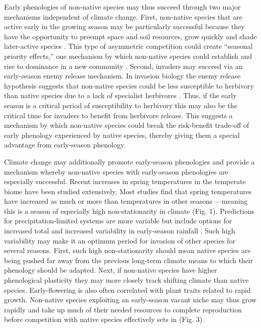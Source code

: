 \documentclass[11pt,a4paper,oneside]{article}
\begin{document}
Early phenologies of non-native species may thus succeed through two major mechanisms independent of climate change. First, non-native species that are active early in the growing season may be particularly successful because they have the opportunity to preempt space and soil resources, grow quickly and shade later-active species \citep{Weiner1990,Wilsey:2011cr,wolkovich:2010fee}. This type of asymmetric competition could create ``seasonal priority effects,'' one mechanism by which non-native species could establish and rise to dominance in a new community \citep{dickson2012,Wainwright:2012tw}. Second, invaders may succeed via an early-season enemy release mechanism. In invasion biology the enemy release hypothesis suggests that non-native species could be less susceptible to herbivory than native species due to a lack of specialist herbivores \citep{Keane:2002uz,Liu:2006kj}. Thus, if the early season is a critical period of susceptibility to herbivory \citep{Feeny1970,Barbehenn2013} this may also be the critical time for invaders to benefit from herbivore release. This suggests a mechanism by which non-native species could break the risk-benefit trade-off of early phenology experienced by native species, thereby giving them a special advantage from early-season phenology.

Climate change may additionally promote early-season phenologies and provide a mechanism whereby non-native species with early-season phenologies are especially successful. Recent increases in spring temperatures in the temperate biome \citep[at least partially associated with increases in greenhouse gases, see][]{Trenberth:2007hk} have been studied extensively. Most studies find that spring temperatures have increased as much or more than temperatures in other seasons \citep{cohen2012}---meaning this is a season of especially high non-stationarity in climate (Fig. 1). Predictions for precipitation-limited systems are more variable but include options for increased total and increased variability in early-season rainfall \citep{Trenberth:2007hk,knutti2013}. Such high variability may make it an optimum period for invasion of other species for several reasons. First, such high non-stationarity should mean native species are being pushed far away from the previous long-term climate means to which their phenology should be adapted. Next, if non-native species have higher phenological plasticity \citep[e.g.,][]{wainwright2013} they may more closely track shifting climate than native species. Early-flowering is also often correlated with plant traits related to rapid growth. Non-native species exploiting an early-season vacant niche may thus grow rapidly and take up much of their needed resources to complete reproduction before competition with native species effectively sets in (Fig. 3). \\
\end{document}
